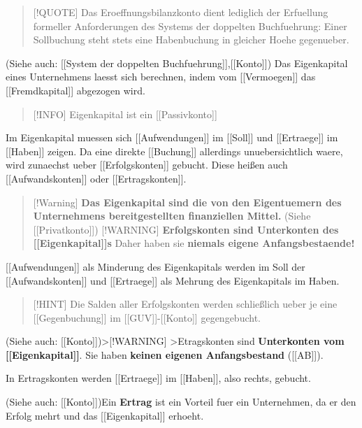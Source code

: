 \begin{quote}
{[}!QUOTE{]} Das Eroeffnungsbilanzkonto dient lediglich der Erfuellung
formeller Anforderungen des Systems der doppelten Buchfuehrung: Einer
Sollbuchung steht stets eine Habenbuchung in gleicher Hoehe gegenueber.
\end{quote}

(Siehe auch: {[}{[}System der doppelten
Buchfuehrung{]}{]},{[}{[}Konto{]}{]}) Das Eigenkapital eines Unternehmens
laesst sich berechnen, indem vom {[}{[}Vermoegen{]}{]} das
{[}{[}Fremdkapital{]}{]} abgezogen wird.

\begin{quote}
{[}!INFO{]} Eigenkapital ist ein {[}{[}Passivkonto{]}{]}
\end{quote}

Im Eigenkapital muessen sich {[}{[}Aufwendungen{]}{]} im {[}{[}Soll{]}{]}
und {[}{[}Ertraege{]}{]} im {[}{[}Haben{]}{]} zeigen. Da eine direkte
{[}{[}Buchung{]}{]} allerdings unuebersichtlich waere, wird zunaechst ueber
{[}{[}Erfolgskonten{]}{]} gebucht. Diese heißen auch
{[}{[}Aufwandskonten{]}{]} oder {[}{[}Ertragskonten{]}{]}.

\begin{quote}
{[}!Warning{]} \textbf{Das Eigenkapital sind die von den Eigentuemern des
Unternehmens bereitgestellten finanziellen Mittel. } (Siehe
{[}{[}Privatkonto{]}{]}) {[}!WARNING{]} \textbf{Erfolgskonten sind
Unterkonten des {[}{[}Eigenkapital{]}{]}s} Daher haben sie
\textbf{niemals eigene Anfangsbestaende!}
\end{quote}

{[}{[}Aufwendungen{]}{]} als Minderung des Eigenkapitals werden im Soll
der {[}{[}Aufwandskonten{]}{]} und {[}{[}Ertraege{]}{]} als Mehrung des
Eigenkapitals im Haben.

\begin{quote}
{[}!HINT{]} Die Salden aller Erfolgskonten werden schließlich ueber je
eine {[}{[}Gegenbuchung{]}{]} im {[}{[}GUV{]}{]}-{[}{[}Konto{]}{]}
gegengebucht.
\end{quote}

(Siehe auch: {[}{[}Konto{]}{]})\textgreater{[}!WARNING{]}
\textgreater Etragskonten sind \textbf{Unterkonten vom
{[}{[}Eigenkapital{]}{]}}. Sie haben \textbf{keinen eigenen
Anfangsbestand} ({[}{[}AB{]}{]}).

In Ertragskonten werden {[}{[}Ertraege{]}{]} im {[}{[}Haben{]}{]}, also
rechts, gebucht.

(Siehe auch: {[}{[}Konto{]}{]})Ein \textbf{Ertrag} ist ein Vorteil fuer
ein Unternehmen, da er den Erfolg mehrt und das {[}{[}Eigenkapital{]}{]}
erhoeht.

